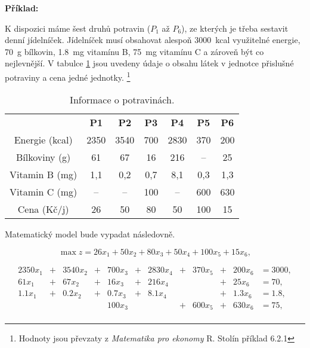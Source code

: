 \textbf{Příklad:}

K dispozici máme šest druhů potravin ($P_1$ až $P_6$), ze kterých je třeba sestavit denní jídelníček.
Jídelníček musí obsahovat alespoň \SI{3000}{kcal} využitelné energie,
\SI{70}{g} bílkovin,
\SI{1,8}{mg} vitamínu B,
\SI{75}{mg} vitamínu C a zároveň být co nejlevnější.
V tabulce \ref{tab:potraviny} jsou uvedeny údaje o obsahu látek v jednotce přislušné potraviny a cena jedné jednotky.
\footnote{Hodnoty jsou převzaty z \textit{Matematika pro ekonomy} R. Stolín \cite{matematika_pro_ekonomy} příklad 6.2.1}
\begin{table}[H]
    \centering
    \begin{tabular}{|c|c|c|c|c|c|c|}
        \hline
        \textbf{} & \textbf{P1} & \textbf{P2} & \textbf{P3} & \textbf{P4} & \textbf{P5} & \textbf{P6} \\
        \hhline{|=|=|=|=|=|=|=|}
        Energie (\si{kcal}) & 2350 & 3540 & 700 & 2830 & 370 & 200\\
        \hline
        Bílkoviny (\si{g}) & 61 & 67 & 16 & 216 & -- & 25\\
        \hline
        Vitamin B (\si{mg}) & 1,1 & 0,2 & 0,7 & 8,1 & 0,3 & 1,3\\
        \hline
        Vitamin C (\si{mg}) & -- & -- & 100 & -- & 600 & 630\\
        \hline
        Cena (Kč/j) & 26 & 50 & 80 & 50 & 100 & 15\\
        \hline
    \end{tabular}
    \caption{Informace o potravinách.}
    \label{tab:potraviny}
\end{table}

Matematický model bude vypadat následovně.


\begin{equation*}
    \max z = 26x_1 + 50x_2 + 80x_3 + 50x_4 + 100x_5 + 15x_6,
\end{equation*}


\begin{equation}
    \begin{aligned}
    2350x_1 &+ &3540x_2 &+ &700x_3 &+ &2830x_4 &+ &370x_5 &+ &200x_6 &= 3000, \\
    61x_1 &+ &67x_2 &+ &16x_3 &+ &216x_4 && &+ &25x_6 &= 70, \\
    1.1x_1 &+ &0.2x_2 &+ &0.7x_3 &+ &8.1x_4 && &+ &1.3x_6 &= 1.8, \\
    &&&& 100x_3 && &+ &600x_5 &+ &630x_6 &= 75, \\
    \end{aligned}
\end{equation}

